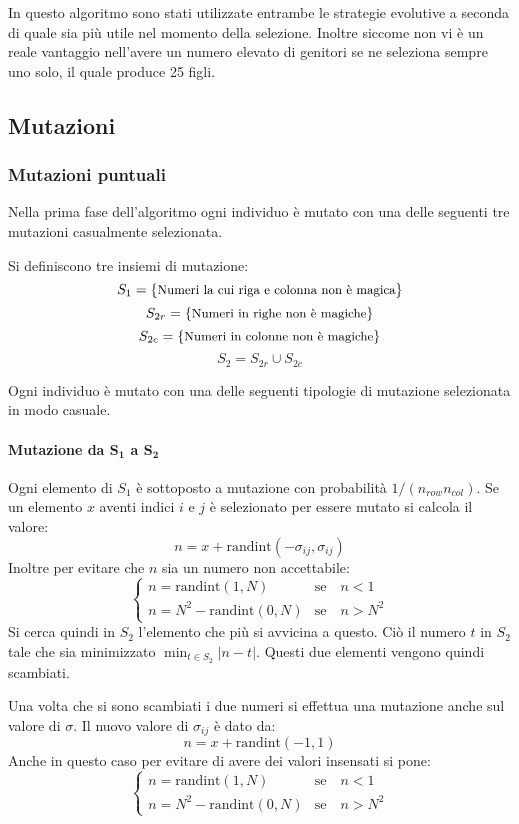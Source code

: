 \documentclass[italian,twoside,twocolumn]{article}
\begin{document}
In questo algoritmo sono stati utilizzate entrambe le strategie evolutive a seconda di quale sia più utile nel momento della selezione. Inoltre siccome non vi è un reale vantaggio nell'avere un numero elevato di genitori se ne seleziona sempre uno solo, il quale produce 25 figli. 

\subsection{Mutazioni}

\subsubsection{Mutazioni puntuali}
Nella prima fase dell'algoritmo ogni individuo è mutato con una delle seguenti tre mutazioni casualmente selezionata. 

Si definiscono tre insiemi di mutazione:
\[S_1 = \{\text{\small Numeri la cui riga e colonna non è magica}\}	\]
\[S_{2r} = \{\text{\small Numeri in righe non è magiche}\}	\]
\[S_{2c} = \{\text{\small Numeri in colonne non è magiche}\}	\]
\[S_{2} = S_{2r} \cup S_{2c}	\]

Ogni individuo è mutato con una delle seguenti tipologie di mutazione selezionata in modo casuale.
\paragraph{Mutazione da $ \mathbf{S_1} $ a $ \mathbf{S_2} $}
Ogni elemento di $ S_1 $ è sottoposto a mutazione con probabilità $ 1\slash(n_{row}n_{col}) $. Se un elemento $ x $ aventi indici $ i $ e $ j $ è selezionato per essere mutato si calcola il valore:
\[ n = 	x + \text{randint}(-\sigma_{ij}, \sigma_{ij})  \]
Inoltre per evitare che $ n $ sia un numero non accettabile:
\[
\begin{cases}
	n = \text{randint}(1,N) & \text{se} \quad n < 1  \\
	n = N^2 - \text{randint}(0,N) & \text{se} \quad n > N^2  
\end{cases}
\]
Si cerca quindi in $ S_2 $ l'elemento che più si avvicina a questo. Ciò il numero $ t $ in $ S_2 $ tale che sia minimizzato $ \min_{t \in S_2} \lvert n - t \rvert $. Questi due elementi vengono quindi scambiati. 

Una volta che si sono scambiati i due numeri si effettua una mutazione anche sul valore di $ \sigma $.
Il nuovo valore di $ \sigma_{ij} $ è dato da: 
\[ n = 	x + \text{randint}(-1, 1)  \]
Anche in questo caso per evitare di avere dei valori insensati si pone:
\[
\begin{cases}
n = \text{randint}(1,N) & \text{se} \quad n < 1  \\
n = N^2 - \text{randint}(0,N) & \text{se} \quad n > N^2  
\end{cases}
\]
\end{document}
